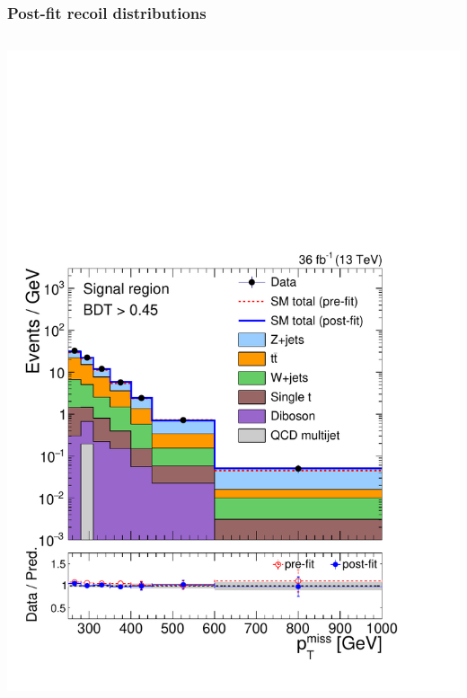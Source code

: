 \documentclass[aspectratio=169,xcolor=dvipsnames,,table,compress]{beamer}
\begin{document}
\begin{frame}[t] \frametitle{Post-fit recoil distributions}
  \vspace{-7mm}
  \begin{columns}[T]
    \begin{column}{0.25\textwidth}
      \centering
      \vspace{-3.5mm}
      \includegraphics[width=\textwidth]{../figures/monotop/postfit/stackedPostfit_signal_monotop.pdf}\\
      \vspace{-5.5mm}

\end{column}
\end{columns}
\end{frame}
\end{document}
